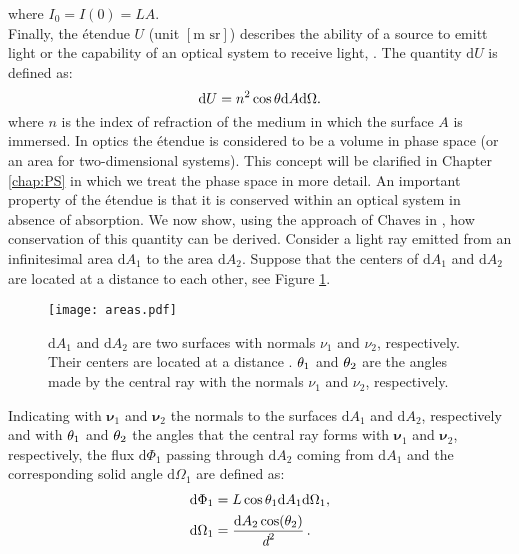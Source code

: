 where $I_0 = I(0) = LA$. \\
\indent Finally, the \'{e}tendue $U$ (unit $[\textrm{m sr}]$) describes the ability of a source to emitt light or the capability of an optical system to receive light, \cite{zhu2011etendue}.
The quantity $ \textrm{d}U $ is defined as:
\begin{equation}\label{etendue}
\textrm{d}U = n^2 \cos\theta\textrm{d}A\textrm{d}\Omega.
\end{equation}
where $n$ is the index of refraction of the medium in which the surface $A$ is immersed. In optics the \'{e}tendue is considered to be a volume in phase space  (or an area for two-dimensional systems). This concept will be clarified in Chapter \ref{chap:PS} in which we treat the phase space in more detail.
An important property of the \'{e}tendue is that it is conserved within an optical system in absence of absorption. We now show, using the approach of Chaves in \cite{chaves2015introduction}, 
how conservation of this quantity can be derived.
Consider a light ray emitted from an infinitesimal area $\textrm{d}A_1$ to the area $\textrm{d}A_2$. Suppose that the centers of $\textrm{d}A_1$ and $\textrm{d}A_2$ 
are located at a distance  to each other,  see Figure \ref{fig:etendue_conservation}.
\begin{figure}[h]
 \label{fig:etendue_conservation}
     \begin{center}
     \texttt{[image: areas.pdf]}
     \end{center}
     \caption{$\textrm{d}A_1$ and $\textrm{d}A_2$ are two surfaces with normals $\nu_1$ and $\nu_2$, respectively. Their centers are located at a distance .
$\theta_1$ and $\theta_2$ are the angles made by the central ray with the normals $\nu_1$ and $\nu_2$, respectively.}
\label{fig:etendue_conservation}
 \end{figure}
Indicating with $\boldsymbol{\nu}_1$ and $\boldsymbol{\nu}_2$ the normals to the surfaces $\textrm{d}A_1$ and $\textrm{d}A_2$, respectively and with $\theta_1$ and $\theta_2$ the angles that the central ray forms with $\boldsymbol{\nu}_1$ and $\boldsymbol{\nu}_2$, respectively,
the flux $\textrm{d}\Phi_1$ passing through $\textrm{d}A_2$ coming from $\textrm{d}A_1$ and the corresponding solid angle $\textrm{d}\Omega_1 $ are defined as:
\begin{equation}
\begin{split}
\textrm{d}\Phi_1 &= L \cos\theta_1 \textrm{d}A_1 \textrm{d}\Omega_1, \\
\textrm{d}\Omega_1 &= \frac{\textrm{d}A_2\cos(\theta_2)}{\textit{d}^2}\,.
\end{split}
\end{equation}
